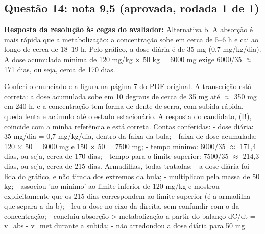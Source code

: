 \documentclass{article}%
\begin{document}
\subsection*{Questão 14: nota 9,5 (aprovada, rodada 1 de 1)}%
\textbf{Resposta da resolução às cegas do avaliador:} Alternativa b. A absorção é mais rápida que a metabolização: a concentração sobe em cerca de 5--6 h e cai ao longo de cerca de 18--19 h. Pelo gráfico, a dose diária é de 35 mg (0,7 mg/kg/dia). A dose acumulada mínima de 120 mg/kg $\times$ 50 kg = 6000 mg exige 6000/35 $\approx$ 171 dias, ou seja, cerca de 170 dias.\par %
Conferi o enunciado e a figura na página 7 do PDF original. A transcrição está correta: a dose acumulada sobe em 10 degraus de cerca de 35 mg até $\approx$ 350 mg em 240 h, e a concentração tem forma de dente de serra, com subida rápida, queda lenta e acúmulo até o estado estacionário. A resposta do candidato, (B), coincide com a minha referência e está correta.\newline%
\newline%
Contas conferidas:\newline%
{-} dose diária: 35 mg/dia = 0,7 mg/kg/dia, dentro da faixa da bula;\newline%
{-} faixa de dose acumulada: 120 $\times$ 50 = 6000 mg e 150 $\times$ 50 = 7500 mg;\newline%
{-} tempo mínimo: 6000/35 $\approx$ 171,4 dias, ou seja, cerca de 170 dias;\newline%
{-} tempo para o limite superior: 7500/35 $\approx$ 214,3 dias, ou seja, cerca de 215 dias.\newline%
\newline%
Armadilhas, todas tratadas:\newline%
{-} a dose diária foi lida do gráfico, e não tirada dos extremos da bula;\newline%
{-} multiplicou pela massa de 50 kg;\newline%
{-} associou 'no mínimo' ao limite inferior de 120 mg/kg e mostrou explicitamente que os 215 dias correspondem ao limite superior (é a armadilha que separa a da b);\newline%
{-} leu a dose no eixo da direita, sem confundir com o da concentração;\newline%
{-} concluiu absorção > metabolização a partir do balanço dC/dt = v\_abs - v\_met durante a subida;\newline%
{-} não arredondou a dose diária para 50 mg.\newline%
\end{document}
